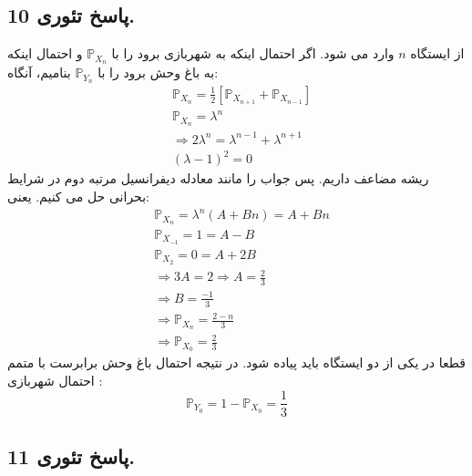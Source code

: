 \documentclass[]{article}
\begin{document}
	\subsection{پاسخ تئوری 10.}
	از ایستگاه $n$ وارد می شود. اگر احتمال اینکه به شهربازی برود را با
	 $\mathbb{P}_{X_n}$
	  و احتمال اینکه به باغ وحش برود را با
	 $\mathbb{P}_{Y_n}$
	  بنامیم، آنگاه:
	\begin{equation}
		\nonumber
		\begin{split}
			&\mathbb{P}_{X_n} = \frac{1}{2}[\mathbb{P}_{X_{n+1}} + \mathbb{P}_{X_{n-1}}]\\
			&\mathbb{P}_{X_n} = \lambda^n\\
			&\Rightarrow 2\lambda^n = \lambda^{n-1} + \lambda^{n+1}\\
			&(\lambda - 1)^2=0
		\end{split}
	\end{equation}
	ریشه مضاعف داریم. پس جواب را مانند معادله دیفرانسیل مرتبه دوم در شرایط بحرانی حل می کنیم. یعنی:
	\begin{equation}
		\nonumber
		\begin{split}
			&\mathbb{P}_{X_n} = \lambda^n (A+Bn) = A+ Bn\\
			&\mathbb{P}_{X_{-1}} = 1 = A-B\\
			&\mathbb{P}_{X_2} = 0 = A + 2B\\
			&\Rightarrow 3A = 2 \Rightarrow A=\frac{2}{3}\\
			&\Rightarrow B = \frac{-1}{3}\\
			&\Rightarrow \mathbb{P}_{X_n} = \frac{2-n}{3}\\
			&\Longrightarrow \mathbb{P}_{X_0} = \frac{2}{3}
		\end{split}
	\end{equation}
	قطعا در یکی از دو ایستگاه باید پیاده شود. در نتیجه  احتمال باغ وحش برابرست با متمم احتمال شهربازی :
	\begin{equation}
		\nonumber
		\mathbb{P}_{Y_0} = 1 - \mathbb{P}_{X_0} = \frac{1}{3}
	\end{equation}
	\newpage
	\subsection{پاسخ تئوری 11.}
\end{document}
